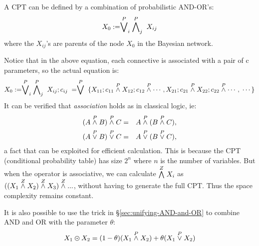 A CPT can be defined by a combination of probabilistic AND-OR's:
\begin{equation}
X_0 := \stackrel{P}{\bigvee}_i \; \stackrel{P}{\bigwedge}_j \; X_{ij}
\end{equation}
where the $X_{ij}$'s are parents of the node $X_0$ in the Bayesian network.

Notice that in the above equation, each connective is associated with a pair of c parameters, so the actual equation is:
\begin{equation}
X_0 := \stackrel{P}{\bigvee}_i \; \stackrel{P}{\bigwedge}_j \; X_{ij};c_{ij} \; = \stackrel{P}{\bigvee} \; \{ X_{11};c_{11} \stackrel{P}{\wedge} X_{12};c_{12} \stackrel{P}{\wedge} \cdots, X_{21};c_{21} \stackrel{P}{\wedge} X_{22};c_{22} \stackrel{P}{\wedge} \cdots, \; \cdots \}
\end{equation}
It can be verified that \emph{association} holds as in classical logic, ie:
\begin{eqnarray}
(A \stackrel{P}{\wedge} B) \stackrel{P}{\wedge} C & = & A \stackrel{P}{\wedge} (B \stackrel{P}{\wedge} C), \nonumber\\
(A \stackrel{P}{\vee}   B) \stackrel{P}{\vee}   C & = & A \stackrel{P}{\vee}   (B \stackrel{P}{\vee}   C),
\label{eqn:P-and-or-associativity}
\end{eqnarray}
a fact that can be exploited for efficient calculation.  This is because the CPT (conditional probability table) has size $2^n$ where $n$ is the number of variables.  But when the operator is associative, we can calculate $\stackrel{Z}{\bigwedge} X_i$ as $((X_1 \stackrel{Z}{\wedge} X_2) \stackrel{Z}{\wedge} X_3) \stackrel{Z}{\wedge} ...$, without having to generate the full CPT.  Thus the space complexity remains constant.

It is also possible to use the trick in \S\ref{sec:unifying-AND-and-OR} to combine AND and OR with the parameter $\theta$:
\begin{equation}
X_1 \varodot X_2 = (1-\theta) (X_1 \stackrel{P}{\wedge} X_2) + \theta (X_1 \stackrel{P}{\vee} X_2)
\end{equation}

